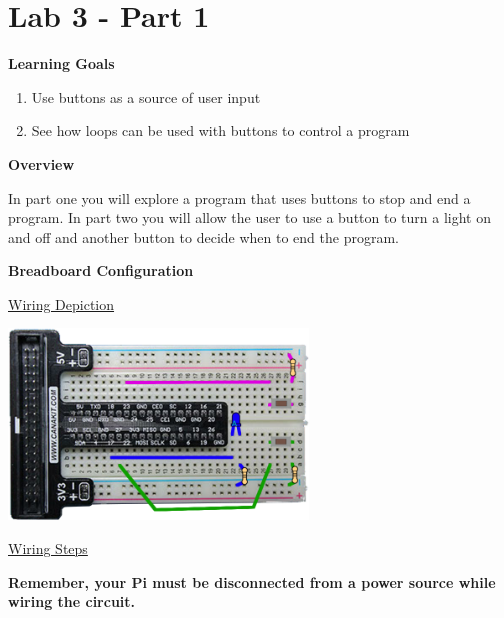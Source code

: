 \newpage

\section{Lab 3 - Part 1}

\textbf{Learning Goals}

\begin{enumerate}
	\item Use buttons as a source of user input
	\item See how loops can be used with buttons to control a program
\end{enumerate}

\textbf{Overview}

In part one you will explore a program that uses buttons to stop and end a program. In part two you will allow the user to use a button to turn a light on and off and another button to decide when to end the program.

\textbf{Breadboard Configuration}

\underline{Wiring Depiction}

\beforefig
\centerline{\includegraphics[height=2in]{pi_images/lab03images/PiLab03-ButtonLight.png}}
\afterfig

\underline{Wiring Steps}

\textbf{Remember, your Pi must be disconnected from a power source while wiring the circuit.}

